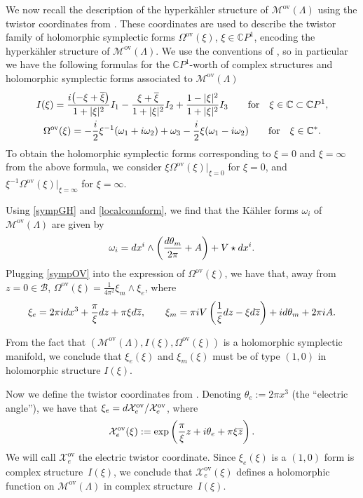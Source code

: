 \documentclass[11pt]{article}
\numberwithin{equation}{section}
\numberwithin{equation}{section}
\newcommand{\CP}{\mathbb{C}P^1}
\begin{document}
We now recall the description of the hyperk\"ahler structure of $\mathcal{M}^{\text{ov}}(\Lambda)$ using the twistor coordinates from \cite{GMN1}. These coordinates are used to describe the twistor family of holomorphic symplectic forms $\Omega^{\text{ov}}(\xi)$, $\xi\in \CP$, encoding the hyperk\"ahler structure of $\mathcal{M}^{\text{ov}}(\Lambda)$. We use the conventions of \cite{GMN1}, so in particular we have the following formulas for the $\CP$-worth of complex structures and holomorphic symplectic forms associated to $\mathcal{M}^{\text{ov}}(\Lambda)$
\begin{gather*}
 I(\xi)=\frac{{\rm i}\bigl(-\xi +\overline{\xi}\bigr)}{1+|\xi|^2}I_1 - \frac{\xi + \overline{\xi}}{1+|\xi|^2}I_2 + \frac{1-|\xi|^2}{1+|\xi|^2}I_3 \qquad \text{for} \quad \xi \in \mathbb{C}\subset \CP,\\
 \Omega^{\text{ov}}(\xi)=-\frac{{\rm i}}{2}\xi^{-1}(\omega_1+{\rm i}\omega_2)+\omega_3-\frac{{\rm i}}{2}\xi(\omega_1-{\rm i}\omega_2) \qquad\text{for} \quad \xi \in \mathbb{C}^*.
\end{gather*}
To obtain the holomorphic symplectic forms corresponding to $\xi=0$ and $\xi=\infty$ from the above formula, we consider $\xi\Omega^{\text{ov}}(\xi)|_{\xi=0}$ for $\xi=0$, and $\xi^{-1}\Omega^{\text{ov}}(\xi)|_{\xi=\infty}$ for $\xi=\infty$.

Using \eqref{sympGH} and \eqref{localconnform}, we find that the K\"ahler forms $\omega_i$ of $\mathcal{M}^{\text{ov}}(\Lambda)$ are given by
\begin{equation}\label{sympOV}
 \omega_i = {\rm d}x^i\wedge \left(\frac{{\rm d}\theta_m}{2\pi} + A\right) + V\star {\rm d}x^i.
\end{equation}
Plugging \eqref{sympOV} into the expression of $\Omega^{\text{ov}}(\xi)$, we have that, away from $z=0\in \mathcal{B}$,
 $
 \Omega^{\text{ov}}(\xi)=\frac{1}{4\pi^2}\xi_m\wedge\xi_e$,
 where
 \begin{equation*}
 \xi_e=2\pi {\rm i}{\rm d}x^3 + \frac{\pi}{\xi}{\rm d}z+\pi\xi {\rm d}\overline{z},\qquad
 \xi_m=\pi {\rm i}V\left(\frac{1}{\xi}{\rm d}z-\xi {\rm d}\overline{z}\right)+ {\rm i}{\rm d}\theta_m +2\pi {\rm i}A.
 \end{equation*}


From the fact that $(\mathcal{M}^{\text{ov}}(\Lambda),I(\xi),\Omega^{\text{ov}}(\xi))$ is a holomorphic symplectic manifold, we conclude that $\xi_e(\xi)$ and $\xi_m(\xi)$ must be of type $(1,0)$ in holomorphic structure $I(\xi)$.

Now we define the twistor coordinates from \cite{GMN1}. Denoting $\theta_e:=2\pi x^3$ (the ``electric angle''), we have that $\xi_e={\rm d}\mathcal{X}_e^\text{ov} / \mathcal{X}_e^\text{ov}$, where
\begin{equation}\label{OV electric}
 \mathcal{X}_e^\text{ov}(\xi):=\exp \left(\frac{\pi}{\xi}z+{\rm i}\theta_e +\pi\xi \overline{z}\right).
\end{equation}
We will call $\mathcal{X}_e^\text{ov}$ the electric twistor coordinate. Since $\xi_e(\xi)$ is a $(1,0)$ form is complex structure~$I(\xi)$, we conclude that $\mathcal{X}_e^\text{ov}(\xi)$ defines a holomorphic function on $\mathcal{M}^{\text{ov}}(\Lambda)$ in complex structure~$I(\xi)$.
\end{document}
